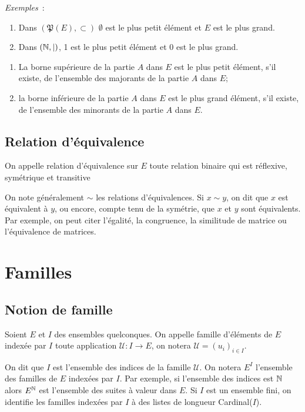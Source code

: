 %
\emph{Exemples}~:
\begin{enumerate}
\item Dans $(\mathfrak{P}(E), \subset)$ $\emptyset$ est le plus petit élément et $E$ est le plus grand.
\item Dans $(\mathbb{N},|)$, 1 est le plus petit élément et 0 est le plus grand.
\end{enumerate}
%
\begin{defdef}
\begin{enumerate}
\item La borne supérieure de la partie $A$ dans $E$ est le plus petit élément, s'il existe, de l'ensemble des majorants de la partie $A$ dans $E$;
\item la borne inférieure de la partie $A$ dans $E$ est le plus grand élément, s'il existe, de l'ensemble des minorants de la partie $A$ dans $E$.
\end{enumerate}
\end{defdef}
%
\subsection{Relation d'équivalence}
\label{chap3-subsec:relationequivalence}
\begin{defdef}
On appelle relation d'équivalence sur $E$ toute relation binaire qui est réflexive, symétrique et transitive
\end{defdef}
On note généralement $\sim$ les relations d'équivalences. Si $x \sim y$, on dit que $x$ est équivalent à $y$, ou encore, compte tenu de la symétrie, que $x$ et $y$ sont équivalents. Par exemple, on peut citer l'égalité, la congruence, la similitude de matrice ou l'équivalence de matrices.
%
\section{Familles}
\label{chap3-sec:familles}
\subsection{Notion de famille}
\label{chap3-subsec:notionfamille}
\begin{defdef}
Soient $E$ et $I$ des ensembles quelconques. On appelle famille d'éléments de $E$ indexée par $I$ toute application $\mathcal{U} : I \longrightarrow E$, on notera $\mathcal{U}=(u_i)_{i \in I}$.
\end{defdef}
%
On dit que $I$ est l'ensemble des indices de la famille $\mathcal{U}$. On notera $E^I$ l'ensemble des familles de $E$ indexées par $I$. Par exemple, si l'ensemble des indices est $\mathbb{N}$ alors $E^{\mathbb{N}}$ est l'ensemble des suites à valeur dans $E$. Si $I$ est un ensemble fini, on identifie les familles indexées par $I$ à des listes de longueur Cardinal($I$).
%
